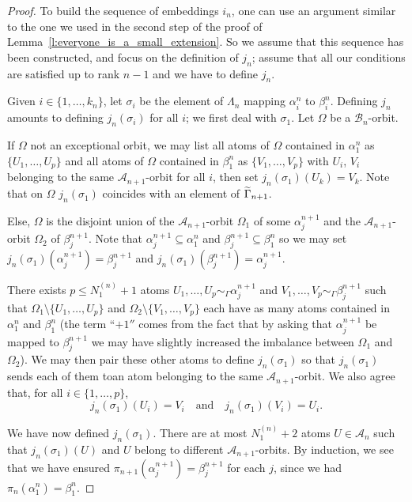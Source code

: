 \documentclass[AHL,Unicode]{cedram}
\newcommand{\mcA}{\mathcal{A}}
\newcommand{\mcB}{\mathcal{B}}
\let\oldtilde\tilde
\renewcommand*{\tilde}[1]{\mathchoice{\widetilde{#1}}{\widetilde{#1}}{\oldtilde{#1}}{\oldtilde{#1}}}
\newcounter{setofstep}
\newcounter{step}[setofstep]
\begin{document}
\begin{proof}
To build the sequence of embeddings $i_n$, one can use an argument similar to the one we used in the second step of the proof of Lemma~\ref{l:everyone_is_a_small_extension}. So we assume that this sequence has been constructed, and focus on the definition of $j_n$; assume that all our conditions are satisfied up to rank $n-1$ and we have to define $j_n$.

Given $i \in \{1,\dots,k_n\}$, let $\sigma_i$ be the element of $\Lambda_n$ mapping $\alpha_i^n$ to $\beta_i^n$. Defining $j_n$ amounts to defining $j_n(\sigma_i)$ for all $i$; we first deal with $\sigma_1$. Let $\Omega$ be a $\mcB_n$-orbit.

If $\Omega$ not an exceptional orbit, we may list all atoms of $\Omega$ contained in $\alpha_1^n$ as $\{U_1,\dots,U_p\}$ and all atoms of $\Omega$ contained in $\beta_1^n$ as $\{V_1,\dots,V_p\}$ with $U_i$, $V_i$ belonging to the same $\mcA_{n+1}$-orbit for all $i$, then set $j_n(\sigma_1)(U_k)=V_k$. Note that on $\Omega$ $j_n(\sigma_1)$ coincides with an element of $\tilde \Gamma_{n+1}$.

Else, $\Omega$ is the disjoint union of the $\mcA_{n+1}$-orbit $\Omega_1$ of some $\alpha_j^{n+1}$ and the $\mcA_{n+1}$-orbit $\Omega_2$ of $\beta_j^{n+1}$. Note that $\alpha_j^{n+1} \subseteq \alpha_1^n$ and $\beta_j^{n+1} \subseteq \beta_1^n$ so we may set $j_n(\sigma_1)(\alpha_j^{n+1})=\beta_j^{n+1}$ and $j_n(\sigma_1)(\beta_j^{n+1})=\alpha_j^{n+1}$.

There exists $p \le N_1^{(n)} +1$ atoms $U_1,\dots,U_p \sim_\Gamma \alpha_j^{n+1}$ and $V_1,\dots,V_p \sim_\Gamma \beta_j^{n+1}$ such that $\Omega_1 \setminus \{U_1,\dots,U_p\}$ and $\Omega_2 \setminus\{V_1,\dots,V_p\}$ each have as many atoms contained in $\alpha_1^n$ and $\beta_ 1^n$ (the term ``$+1''$ comes from the fact that by asking that $\alpha_j^{n+1}$ be mapped to $\beta_j^{n+1}$ we may have slightly increased the imbalance between $\Omega_1$ and $\Omega_2$). We may then pair these other atoms to define $j_n(\sigma_1)$ so that $j_n(\sigma_1)$ sends each of them to\linebreak an atom belonging to the same $\mcA_{n+1}$-orbit. We also agree that, for all $i \in \{1,\dots,p\}$,
\[
j_n(\sigma_1)(U_i)= V_i \quad \text{and}\quad j_n(\sigma_1)(V_i)= U_i.
\]

We have now defined $j_n(\sigma_1)$. There are at most $N_1^{(n)}+2$ atoms $U \in \mcA_n$ such that $j_n(\sigma_1)(U)$ and $U$ belong to different $\mcA_{n+1}$-orbits. By induction, we see that we have ensured $\pi_{n+1}(\alpha_j^{n+1})=\beta_j^{n+1}$ for each $j$, since we had $\pi_n(\alpha_1^n)=\beta_1^n$.


\end{proof}
\end{document}
